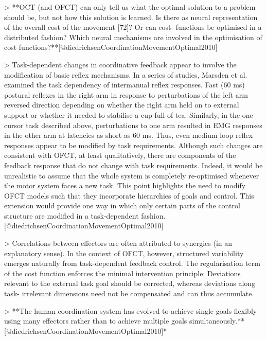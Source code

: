 \documentclass[../main.tex]{subfiles}
\begin{document}
{{> **OCT (and OFCT) can only tell us what the optimal solution to a problem should be, but not how this solution is learned. Is there as neural representation of the overall cost of the movement [72]? Or can cost- functions be optimised in a distributed fashion? Which neural mechanisms are involved in the optimisation of cost functions?**[@diedrichsenCoordinationMovementOptimal2010]



> Task-dependent changes in coordinative feedback appear to involve the modification of basic reflex mechanisms. In a series of studies, Marsden et al. examined the task dependency of intermanual reflex responses. Fast (60 ms) postural reflexes in the right arm in response to perturbations of the left arm reversed direction depending on whether the right arm held on to external support or whether it needed to stabilise a cup full of tea. Similarly, in the one-cursor task described above, perturbations to one arm resulted in EMG responses in the other arm at latencies as short as 60 ms. Thus, even medium loop reflex responses appear to be modified by task requirements. Although such changes are consistent with OFCT, at least qualitatively, there are components of the feedback response that do not change with task requirements. Indeed, it would be unrealistic to assume that the whole system is completely re-optimised whenever the motor system faces a new task. This point highlights the need to modify OFCT models such that they incorporate hierarchies of goals and control. This extension would provide one way in which only certain parts of the control structure are modified in a task-dependent fashion.[@diedrichsenCoordinationMovementOptimal2010]



> Correlations between effectors are often attributed to synergies (in an explanatory sense). In the context of OFCT, however, structured variability emerges naturally from task-dependent feedback control. The regularisation term of the cost function enforces the minimal intervention principle: Deviations relevant to the external task goal should be corrected, whereas deviations along task- irrelevant dimensions need not be compensated and can thus accumulate.



> **The human coordination system has evolved to achieve single goals flexibly using many effectors rather than to achieve multiple goals simultaneously.**[@diedrichsenCoordinationMovementOptimal2010]*



}}
\end{document}
